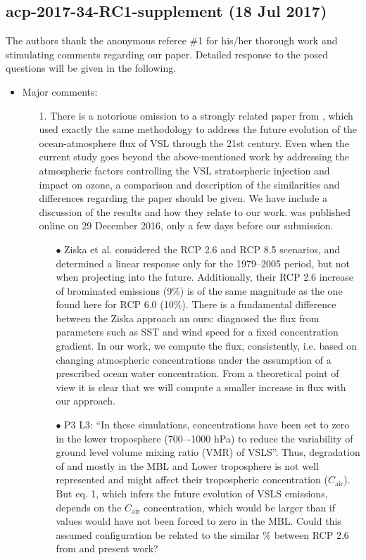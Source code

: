 \subsection*{{\color{blue}acp-2017-34-RC1-supplement (18 Jul 2017)}}
The authors thank the anonymous referee \#1 for his/her thorough work and stimulating comments regarding our paper. Detailed response to the posed questions will be given in the following.
\begin{itemize}
\item Major comments:
\begin{itemize}
\item[1.]{\color{blue}There is a notorious omission to a strongly related paper from \citet{JAC:Ziska2017}, which used exactly the same methodology to address the future evolution of the ocean-atmosphere flux of VSL through the 21st century. Even when the current study goes beyond the above-mentioned work by addressing the atmospheric factors controlling the VSL stratospheric injection and impact on ozone, a comparison and description of the similarities and differences regarding the \citet{JAC:Ziska2017} paper should be given.}
  We have include a discussion of the \citet{JAC:Ziska2017} results and how they relate to our work. \citet{JAC:Ziska2017} was published online on 29 December 2016, only a few days before our submission.
  \begin{itemize}
  \item[$\bullet$]{\color{blue} Ziska et al. considered the RCP 2.6 and RCP 8.5 scenarios, and determined a linear response only for the 1979--2005 period, but not when projecting into the future. Additionally, their RCP 2.6 increase of brominated emissions (9\%) is of the same magnitude as the one found here for RCP 6.0 (10\%).}
    There is a fundamental difference between the Ziska approach an ours: \citet{JAC:Ziska2017} diagnosed the flux from parameters such as SST and wind speed for a fixed concentration gradient. In our work, we compute the flux, consistently, i.e. based on changing atmospheric concentrations under the assumption of a prescribed ocean water concentration. From a theoretical point of view it is clear that we will compute a smaller increase in flux with our approach.
  \item[$\bullet$]{\color{blue} P3 L3: ``In these simulations,  concentrations have been set to zero in the lower troposphere (700–-1000 hPa) to reduce the variability of ground level volume mixing ratio (VMR) of VSLS''. Thus, degradation of  and mostly  in the MBL and Lower troposphere is not well represented and might affect their tropospheric concentration ($C_\mathrm{air}$). But eq. 1, which infers the future evolution of VSLS emissions, depends on the $C_\mathrm{air}$ concentration, which would be larger than if  values would have not been forced to zero in the MBL. Could this assumed configuration be related to the similar \% between RCP 2.6 from \citet{JAC:Ziska2017} and present work?}

\end{itemize}
\end{itemize}
\end{itemize}
